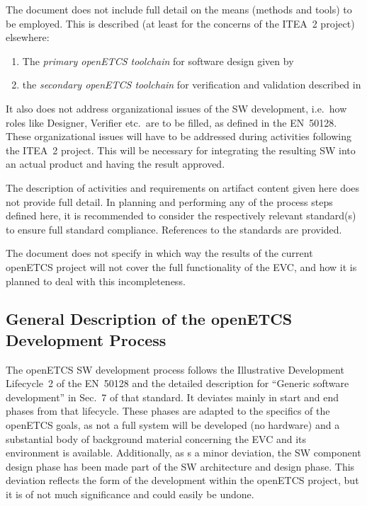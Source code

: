 \documentclass{template/openetcs_article}
\begin{document}
The document does not include full detail on the means (methods and
tools) to be employed. This is described (at least for the concerns of
the ITEA~2 project) elsewhere:
\begin{enumerate}
\item The \emph{primary openETCS toolchain} for software design given
  by \cite{openETCS:D7.1} 
\item the \emph{secondary openETCS toolchain} for verification and
  validation described in \cite{openETCS:D4.1.1.2}
\end{enumerate}
%
It also does not address organizational issues of the SW development,
i.e.\ how roles like Designer, Verifier etc.\ are to be filled, as
defined in the EN~50128.  These organizational issues will have to be
addressed during activities following the ITEA~2 project. This will be
necessary for integrating the resulting SW into an actual product and
having the result approved.

The description of activities and requirements on artifact content
given here does not provide full detail. In planning and performing
any of the process steps defined here, it is recommended to consider
the respectively relevant standard(s) to ensure full standard
compliance. References to the standards are provided.

The document does not specify in which way the results of the current
openETCS project will not cover the full functionality of the EVC, and
how it is planned to deal with this incompleteness.

\subsection{General Description of the openETCS Development Process}
\label{sec:general-description}

The openETCS SW development process follows the Illustrative
Development Lifecycle~2 \cite[Fig.~4]{EN50128:2011} of the EN~50128
and the detailed description for ``Generic software development'' in
Sec.~7 of that standard. It deviates mainly in start and end phases
from that lifecycle. These phases are adapted to the specifics of the
openETCS goals, as not a full system will be developed (no hardware)
and a substantial body of background material concerning the EVC and
its environment is available. Additionally, as s a minor deviation,
the SW component design phase has been made part of the SW
architecture and design phase. This deviation reflects the form of the
development within the openETCS project, but it is of not much
significance and could easily be undone.
\end{document}
